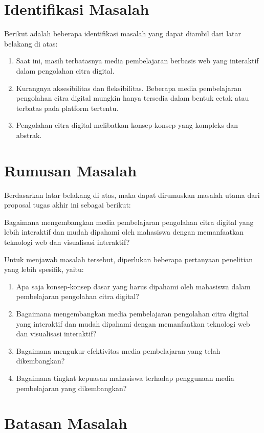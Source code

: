 \section{Identifikasi Masalah}
Berikut adalah beberapa identifikasi masalah yang dapat diambil dari latar belakang di atas:

\begin{enumerate}
  \item Saat ini, masih terbatasnya media pembelajaran berbasis web yang interaktif dalam pengolahan citra digital.
  \item  Kurangnya aksesibilitas dan fleksibilitas. Beberapa media pembelajaran pengolahan citra digital mungkin hanya tersedia dalam bentuk cetak atau terbatas pada platform tertentu.
  \item Pengolahan citra digital melibatkan konsep-konsep yang kompleks dan abstrak.
\end{enumerate}

\section{Rumusan Masalah}
Berdasarkan latar belakang di atas, maka dapat dirumuskan masalah utama dari proposal tugas akhir ini sebagai berikut:

Bagaimana mengembangkan media pembelajaran pengolahan citra digital yang lebih interaktif dan mudah dipahami oleh mahasiswa dengan memanfaatkan teknologi web dan visualisasi interaktif?

Untuk menjawab masalah tersebut, diperlukan beberapa pertanyaan penelitian yang lebih spesifik, yaitu:

\begin{enumerate}
    \item Apa saja konsep-konsep dasar yang harus dipahami oleh mahasiswa dalam pembelajaran pengolahan citra digital?
    \item Bagaimana mengembangkan media pembelajaran pengolahan citra digital yang interaktif dan mudah dipahami dengan memanfaatkan teknologi web dan visualisasi interaktif?
    \item Bagaimana mengukur efektivitas media pembelajaran yang telah dikembangkan?
    \item Bagaimana tingkat kepuasan mahasiswa terhadap penggunaan media pembelajaran yang dikembangkan?
\end{enumerate}

\section{Batasan Masalah}

